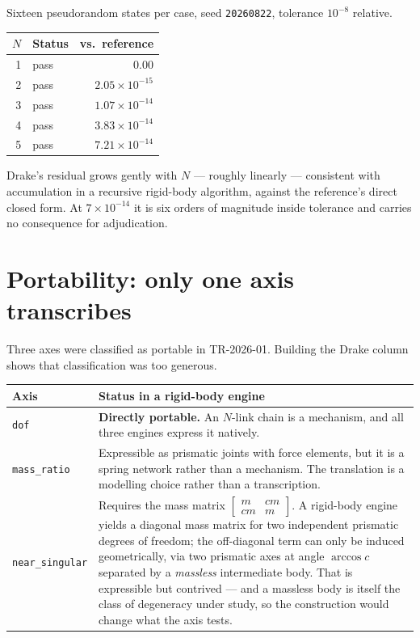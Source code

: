 \documentclass[11pt,a4paper]{article}
\begin{document}
Sixteen pseudorandom states per case, seed \texttt{20260822}, tolerance
$10^{-8}$ relative.

\begin{center}
\begin{tabular}{@{}rlr@{}}
\toprule
\textbf{$N$} & \textbf{Status} & \textbf{vs.\ reference} \\
\midrule
1 & pass & $0.00$ \\
2 & pass & $2.05\times10^{-15}$ \\
3 & pass & $1.07\times10^{-14}$ \\
4 & pass & $3.83\times10^{-14}$ \\
5 & pass & $7.21\times10^{-14}$ \\
\bottomrule
\end{tabular}
\end{center}

\noindent Drake's residual grows gently with $N$ --- roughly linearly ---
consistent with accumulation in a recursive rigid-body algorithm, against the
reference's direct closed form. At $7\times10^{-14}$ it is six orders of
magnitude inside tolerance and carries no consequence for adjudication.

\section{Portability: only one axis transcribes}\label{sec:portability}

Three axes were classified as portable in TR-2026-01. Building the Drake column
shows that classification was too generous.

\begin{center}
\begin{tabular}{@{}lL{0.56\textwidth}@{}}
\toprule
\textbf{Axis} & \textbf{Status in a rigid-body engine} \\
\midrule
\texttt{dof} & \textbf{Directly portable.} An $N$-link chain is a mechanism, and all three engines express it natively. \\
\texttt{mass\_ratio} & Expressible as prismatic joints with force elements, but it is a spring network rather than a mechanism. The translation is a modelling choice rather than a transcription. \\
\texttt{near\_singular} & Requires the mass matrix $\left[\begin{smallmatrix} m & cm \\ cm & m\end{smallmatrix}\right]$. A rigid-body engine yields a diagonal mass matrix for two independent prismatic degrees of freedom; the off-diagonal term can only be induced geometrically, via two prismatic axes at angle $\arccos c$ separated by a \emph{massless} intermediate body. That is expressible but contrived --- and a massless body is itself the class of degeneracy under study, so the construction would change what the axis tests. \\
\bottomrule
\end{tabular}
\end{center}
\end{document}
